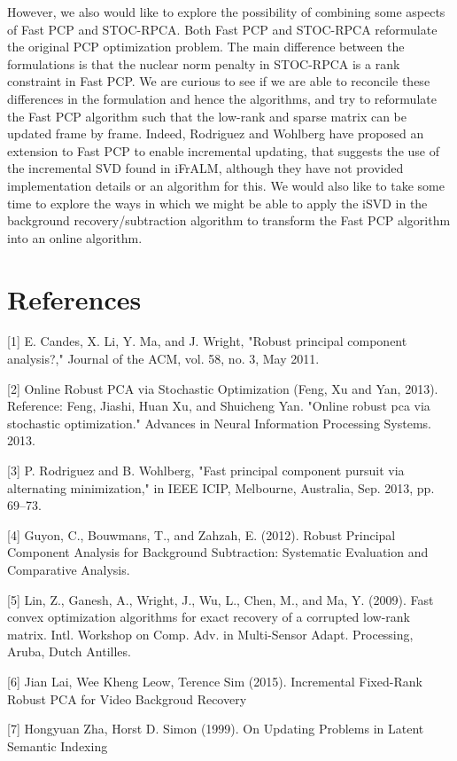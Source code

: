 \documentclass[oneside]{article}
\begin{document}
However, we also would like to explore the possibility of combining some aspects of Fast PCP and STOC-RPCA. Both Fast PCP and STOC-RPCA reformulate the original PCP optimization problem. The main difference between the formulations is that the nuclear norm penalty in STOC-RPCA is a rank constraint in Fast PCP. We are curious to see if we are able to reconcile these differences in the formulation and hence the algorithms, and try to reformulate the Fast PCP algorithm such that the low-rank and sparse matrix can be updated frame by frame. Indeed, Rodriguez and Wohlberg have proposed an extension to Fast PCP to enable incremental updating, that suggests the use of the incremental SVD found in iFrALM, although they have not provided implementation details or an algorithm for this. We would also like to take some time to explore the ways in which we might be able to apply the iSVD in the background recovery/subtraction algorithm to transform the Fast PCP algorithm into an online algorithm.

\section{References}
[1] \hspace*{8pt} E. Candes, X. Li, Y. Ma, and J. Wright, "Robust principal component analysis?," Journal of the ACM, vol. 58,
no. 3, May 2011.

[2] \hspace*{8pt}Online Robust PCA via Stochastic Optimization	(Feng, Xu and Yan, 2013). Reference: Feng, Jiashi, Huan Xu, and Shuicheng Yan. "Online robust pca via stochastic optimization." Advances in Neural Information Processing Systems. 2013.

[3] \hspace*{8pt}P. Rodriguez and B. Wohlberg, "Fast principal component pursuit via alternating minimization," in IEEE ICIP, Melbourne, Australia, Sep. 2013, pp. 69–73.

[4] \hspace*{8pt}Guyon, C., Bouwmans, T., and Zahzah, E. (2012). Robust Principal Component Analysis for Background Subtraction: Systematic Evaluation and Comparative Analysis.

[5] \hspace*{8pt}Lin, Z., Ganesh, A., Wright, J., Wu, L., Chen, M., and Ma, Y. (2009). Fast convex optimization algorithms for exact recovery of a corrupted low-rank matrix. Intl. Workshop on Comp. Adv. in Multi-Sensor Adapt. Processing, Aruba, Dutch Antilles.

[6] \hspace*{8pt}Jian Lai, Wee Kheng Leow, Terence Sim (2015). Incremental Fixed-Rank Robust PCA for Video Backgroud Recovery

[7] \hspace*{8pt}Hongyuan Zha, Horst D. Simon (1999). On Updating Problems in Latent Semantic Indexing
\end{document}
